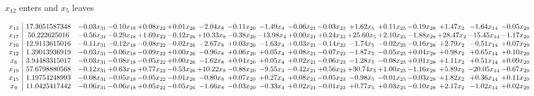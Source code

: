 \documentclass[9pt]{article}
\begin{document}
 $ x_{12} $ enters and $ x_{5} $ leaves 

 \[\begin{array}{c| c c@{\hskip 2pt} c@{\hskip 2pt} c@{\hskip 2pt} c@{\hskip 2pt} c@{\hskip 2pt} c@{\hskip 2pt} c@{\hskip 2pt} c@{\hskip 2pt} c@{\hskip 2pt} c@{\hskip 2pt} c@{\hskip 2pt} c@{\hskip 2pt} c@{\hskip 2pt} c@{\hskip 2pt} c@{\hskip 2pt} }
 x_{13}   &  17.3051587348 & -0.03 x_{31} & -0.10 x_{18} & +  0.08 x_{22} & +  0.01 x_{26} & -2.04 x_{8} & -0.11 x_{20} & -1.49 x_{4} & -0.06 x_{21} & -0.03 x_{23} & +  1.62 x_{5} & +  0.11 x_{25} & -0.19 x_{28} & +  1.47 x_{2} & -1.64 x_{14} & -0.05 x_{29}\\
 x_{17}   &  50.222625016 & -0.56 x_{31} & -0.29 x_{18} & +  1.69 x_{22} & -0.12 x_{26} & + 10.33 x_{8} & -0.38 x_{20} & -13.98 x_{4} & +  0.00 x_{21} & +  0.24 x_{23} & + 25.60 x_{5} & +  2.10 x_{25} & -1.88 x_{28} & + 28.47 x_{2} & -15.45 x_{14} & -1.17 x_{29}\\
 x_{10}   &  12.9113615016 & -0.11 x_{31} & -0.12 x_{18} & -0.08 x_{22} & -0.02 x_{26} & -2.67 x_{8} & +  0.03 x_{20} & -1.63 x_{4} & +  0.03 x_{21} & -0.14 x_{23} & -1.74 x_{5} & -0.02 x_{25} & -0.16 x_{28} & +  2.79 x_{2} & -0.51 x_{14} & +  0.07 x_{29}\\
 x_{12}   &  1.39013936919 & -0.03 x_{31} & -0.06 x_{18} & -0.09 x_{22} & +  0.00 x_{26} & -0.96 x_{8} & +  0.06 x_{20} & +  0.05 x_{4} & +  0.08 x_{21} & -0.07 x_{23} & -1.87 x_{5} & -0.05 x_{25} & +  0.04 x_{28} & +  0.98 x_{2} & +  0.65 x_{14} & +  0.10 x_{29}\\
 x_{6}   &  3.94483315017 & -0.03 x_{31} & -0.08 x_{18} & -0.05 x_{22} & +  0.00 x_{26} & -1.62 x_{8} & +  0.04 x_{20} & +  0.05 x_{4} & +  0.02 x_{21} & -0.06 x_{23} & -1.28 x_{5} & -0.08 x_{25} & +  0.01 x_{28} & +  1.11 x_{2} & +  0.51 x_{14} & +  0.09 x_{29}\\
 x_{19}   &  57.6798880568 & -0.12 x_{31} & +  0.63 x_{18} & +  0.77 x_{22} & -0.53 x_{26} & + 10.22 x_{8} & -0.88 x_{20} & -9.55 x_{4} & -0.42 x_{21} & +  0.56 x_{23} & + 30.74 x_{5} & +  1.00 x_{25} & -1.16 x_{28} & +  5.89 x_{2} & -20.05 x_{14} & -0.67 x_{29}\\
 x_{15}   &  1.19754248993 & -0.08 x_{31} & -0.05 x_{18} & -0.05 x_{22} & -0.01 x_{26} & -0.80 x_{8} & +  0.07 x_{20} & +  0.27 x_{4} & +  0.08 x_{21} & -0.05 x_{23} & -0.98 x_{5} & -0.01 x_{25} & -0.03 x_{28} & +  1.82 x_{2} & +  0.36 x_{14} & +  0.11 x_{29}\\
 x_{9}   &  11.0425417442 & -0.06 x_{31} & -0.06 x_{18} & +  0.05 x_{22} & -0.05 x_{26} & -1.66 x_{8} & -0.03 x_{20} & -0.33 x_{4} & +  0.02 x_{21} & -0.01 x_{23} & +  0.77 x_{5} & +  0.03 x_{25} & -0.10 x_{28} & +  2.17 x_{2} & -1.02 x_{14} & +  0.02 x_{29}\\

\end{array}\]
\end{document}
